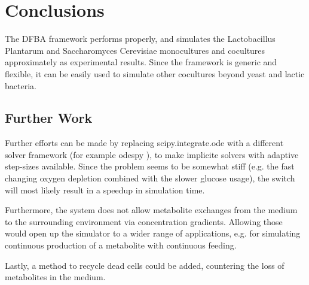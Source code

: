 \section{Conclusions}\label{sec:conclusions}
	The DFBA framework performs properly, and simulates the Lactobacillus Plantarum and Saccharomyces Cerevisiae monocultures and cocultures
	approximately as experimental results.
	Since the framework is generic and flexible, it can be easily used to simulate other cocultures beyond yeast and lactic bacteria.
	
	\subsection{Further Work}
		Further efforts can be made by replacing scipy.integrate.ode with a
		different solver framework (for example odespy \cite{odespy}), to make implicite solvers with adaptive step-sizes available.
		Since the problem seems to be somewhat stiff (e.g. the fast changing oxygen depletion combined with the slower glucose usage),
		the switch will most likely result in a speedup in simulation time.
		
		Furthermore, the system does not allow metabolite exchanges from the medium to the surrounding environment via concentration gradients.
		Allowing those would open up the simulator to a wider range of applications, e.g. for simulating continuous production of a metabolite with
		continuous feeding.
		
		Lastly, a method to recycle dead cells could be added, countering the loss of metabolites in the medium.

